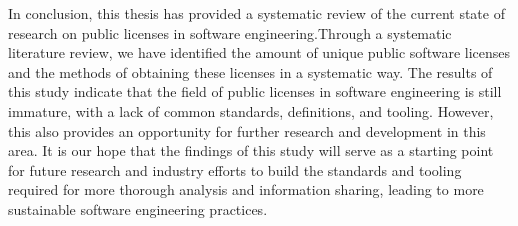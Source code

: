 In conclusion, this thesis has provided a systematic review of the current state of research on public licenses in software engineering.Through a systematic literature review, we have identified the amount of unique public software licenses and the methods of obtaining these licenses in a systematic way. The results of this study indicate that the field of public licenses in software engineering is still immature, with a lack of common standards, definitions, and tooling. However, this also provides an opportunity for further research and development in this area. It is our hope that the findings of this study will serve as a starting point for future research and industry efforts to build the standards and tooling required for more thorough analysis and information sharing, leading to more sustainable software engineering practices.